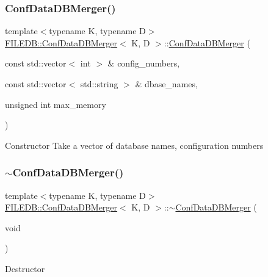 \subsubsection{\texorpdfstring{ConfDataDBMerger()}{ConfDataDBMerger()}\hspace{0.1cm}{\footnotesize\ttfamily [6/6]}}
{\footnotesize\ttfamily template$<$typename K, typename D$>$ \\
\mbox{\hyperlink{classFILEDB_1_1ConfDataDBMerger}{F\+I\+L\+E\+D\+B\+::\+Conf\+Data\+D\+B\+Merger}}$<$ K, D $>$\+::\mbox{\hyperlink{classFILEDB_1_1ConfDataDBMerger}{Conf\+Data\+D\+B\+Merger}} (\begin{DoxyParamCaption}\item[{const std\+::vector$<$ int $>$ \&}]{config\+\_\+numbers,  }\item[{const std\+::vector$<$ std\+::string $>$ \&}]{dbase\+\_\+names,  }\item[{unsigned int}]{max\+\_\+memory }\end{DoxyParamCaption})\hspace{0.3cm}{\ttfamily [inline]}}

Constructor Take a vector of database names, configuration numbers \mbox{\label{classFILEDB_1_1ConfDataDBMerger_a1592d55d089ad7ead813ab8d2b955e09}} 
\subsubsection{\texorpdfstring{$\sim$ConfDataDBMerger()}{~ConfDataDBMerger()}\hspace{0.1cm}{\footnotesize\ttfamily [3/3]}}
{\footnotesize\ttfamily template$<$typename K, typename D$>$ \\
\mbox{\hyperlink{classFILEDB_1_1ConfDataDBMerger}{F\+I\+L\+E\+D\+B\+::\+Conf\+Data\+D\+B\+Merger}}$<$ K, D $>$\+::$\sim$\mbox{\hyperlink{classFILEDB_1_1ConfDataDBMerger}{Conf\+Data\+D\+B\+Merger}} (\begin{DoxyParamCaption}\item[{void}]{ }\end{DoxyParamCaption})\hspace{0.3cm}{\ttfamily [inline]}}

Destructor 

